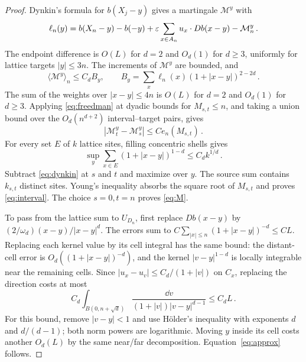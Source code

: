 \begin{proof}
Dynkin's formula for $b(X_j-y)$ gives a martingale $\mathcal M^y$ with
\begin{equation}\label{eq:dynkin}
\ell_n(y)=b(X_n-y)-b(-y)
+\varepsilon\sum_{x\in A_n}u_x\cdot Db(x-y)-\mathcal M_n^y\, .
\end{equation}
The endpoint difference is $O(L)$ for $d=2$ and $O_d(1)$ for $d\geq3$,
uniformly for lattice targets $|y|\leq3n$.
The increments of $\mathcal M^y$ are bounded, and
\begin{equation}\label{eq:bracket}
\langle\mathcal M^y\rangle_n\leq C_d B_y ,\qquad
B_y=\sum_x\ell_n(x)(1+|x-y|)^{2-2d}\, .
\end{equation}
The sum of the weights over $|x-y|\leq4n$ is $O(L)$ for $d=2$
and $O_d(1)$ for $d\geq3$. Applying \eqref{eq:freedman} at dyadic
bounds for $M_{s,t}\leq n$, and taking a union bound over the
$O_d(n^{d+2})$ interval--target pairs, gives
\begin{equation}\label{eq:interval-mart}
|\mathcal M_t^y-\mathcal M_s^y|\leq C e_n(M_{s,t})\, .
\end{equation}
For every set $E$ of $k$ lattice sites, filling concentric shells gives
\begin{equation}\label{eq:packing-lattice}
\sup_y\sum_{x\in E}(1+|x-y|)^{1-d}\leq C_d k^{1/d}\, .
\end{equation}
Subtract \eqref{eq:dynkin} at $s$ and $t$ and maximize over $y$.
The source sum contains $k_{s,t}$ distinct sites. Young's inequality
absorbs the square root of $M_{s,t}$ and proves \eqref{eq:interval}.
The choice $s=0,t=n$ proves \eqref{eq:M}.

To pass from the lattice sum to $U_{D_n}$, first replace $Db(x-y)$
by $(2/\omega_d)(x-y)/|x-y|^d$. The errors sum to
$C\sum_{|x|\leq n}(1+|x-y|)^{-d}\leq CL$.
Replacing each kernel value by its cell integral has the same bound:
the distant-cell error is $O_d((1+|x-y|)^{-d})$, and the kernel
$|v-y|^{1-d}$ is locally integrable near the remaining cells.
Since $|u_x-u_v|\leq C_d/(1+|v|)$ on $C_x$, replacing the direction
costs at most
\begin{equation}\label{eq:direction-error}
C_d\int_{B(0,n+\sqrt d)}
\frac{\dd v}{(1+|v|)|v-y|^{d-1}}\leq C_dL\, .
\end{equation}
For this bound, remove $|v-y|<1$ and use H\"older's inequality with
exponents $d$ and $d/(d-1)$; both norm powers are logarithmic.
Moving $y$ inside its cell costs another $O_d(L)$ by the same
near/far decomposition. Equation~\eqref{eq:approx} follows.
\end{proof}

